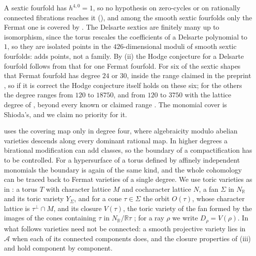 \documentclass[11pt,reqno]{amsart}
\theoremstyle{plain}
\theoremstyle{definition}
\theoremstyle{remark}
\newcommand{\RR}{\mathbb{R}}
\begin{document}
A sextic fourfold has $h^{4,0}=1$, so no hypothesis on zero-cycles or on
rationally connected fibrations reaches it (), and
among the smooth sextic fourfolds only the Fermat one is covered by
. The Delsarte sextics are finitely many
up to isomorphism, since the torus rescales the coefficients of a Delsarte
polynomial to $1$, so they are isolated points in the $426$-dimensional
moduli of smooth sextic fourfolds:  adds points, not a
family. By (ii) the Hodge conjecture for a Delsarte
fourfold follows from that for one Fermat fourfold. For six of the sextic
shapes that Fermat fourfold has degree $24$ or $30$, inside the range claimed
in the preprint \cite{MMMV26}, so if it is correct the Hodge conjecture
itself holds on these six; for the others the degree ranges from $120$ to
$18750$, and from $120$ to $3750$ with the lattice degree of
, beyond every known or claimed range
\cite{Shi79b,MMMV26,Jum26}.
The monomial cover is Shioda's, and we claim no priority for it.

 uses the covering map only in degree four, where
algebraicity modulo abelian varieties descends along every dominant rational
map. In higher degrees a birational modification can add classes, so the
boundary of a compactification has to be controlled. For a hypersurface of a
torus defined by affinely independent monomials the boundary is again of the
same kind, and the whole cohomology can be traced back to Fermat varieties
of a single degree. We use toric varieties as in \cite{CLS11}: a torus $T$
with character lattice $M$ and cocharacter lattice $N$, a fan $\Sigma$ in
$N_{\RR}$ and its toric variety $Y_{\Sigma}$, and for a cone
$\tau\in\Sigma$ the orbit $O(\tau)$, whose character lattice is
$\tau^{\perp}\cap M$, and its closure $V(\tau)$, the toric variety of the
fan formed by the images of the cones containing $\tau$ in
$N_{\RR}/\RR\tau$ \cite[Chapter~3]{CLS11}; for a ray $\rho$ we write
$D_{\rho}=V(\rho)$. In what follows varieties need not be connected: a
smooth projective variety lies in $\mathcal{A}$ when each of its connected
components does, and the closure properties of (iii) and
 hold component by component.
\end{document}
